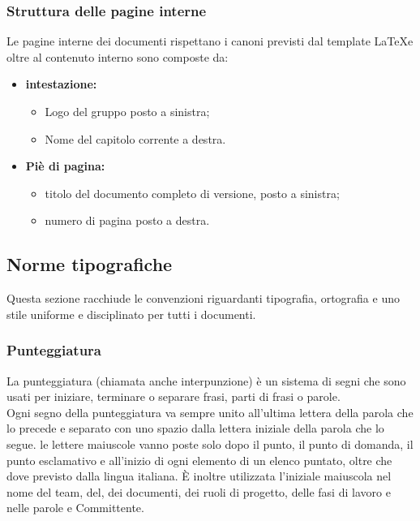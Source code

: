 \subsubsection{Struttura delle pagine interne}
Le pagine interne dei documenti rispettano i canoni previsti dal template \LaTeX e oltre al contenuto interno sono composte da: \\

\begin{itemize}
	\item \textbf{intestazione:}
	\begin{itemize}
		\item Logo del gruppo posto a sinistra;
		\item Nome del capitolo corrente a destra. 
	\end{itemize}
	\item \textbf {Piè di pagina:}
	\begin{itemize}
	\item titolo del documento completo di versione, posto a sinistra;
	\item numero di pagina posto a destra.
	\end{itemize}

\end{itemize} 
\subsection{Norme tipografiche}
Questa sezione racchiude le convenzioni riguardanti tipografia, ortografia e uno stile uniforme e disciplinato per tutti i documenti.
\subsubsection{Punteggiatura}
La punteggiatura (chiamata anche interpunzione) è un sistema di segni che sono usati per iniziare, terminare o separare frasi, parti di frasi o parole. \\
Ogni segno della punteggiatura va sempre unito all'ultima lettera della parola che lo precede e separato con uno spazio dalla lettera iniziale della parola che lo segue.
le lettere maiuscole vanno poste solo dopo il punto, il punto di domanda, il punto esclamativo e all’inizio di ogni elemento di un elenco puntato, oltre che dove previsto dalla lingua italiana. È inoltre utilizzata l’iniziale maiuscola nel nome del team, del, dei documenti, dei ruoli di progetto, delle fasi di lavoro e nelle parole  e Committente.

